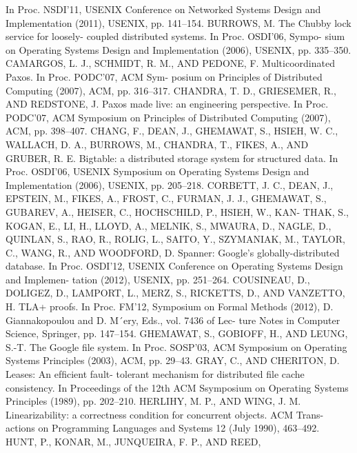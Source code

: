 \begin{thebibliography}{99}
    In Proc. NSDI’11, USENIX Conference on Networked
    Systems Design and Implementation (2011), USENIX,
    pp. 141–154.
     BURROWS, M. The Chubby lock service for loosely-
    coupled distributed systems. In Proc. OSDI’06, Sympo-
    sium on Operating Systems Design and Implementation
    (2006), USENIX, pp. 335–350.
    CAMARGOS, L. J., SCHMIDT, R. M., AND PEDONE, F.
    Multicoordinated Paxos. In Proc. PODC’07, ACM Sym-
    posium on Principles of Distributed Computing (2007),
    ACM, pp. 316–317.
    CHANDRA, T. D., GRIESEMER, R., AND REDSTONE, J.
    Paxos made live: an engineering perspective. In Proc.
    PODC’07, ACM Symposium on Principles of Distributed
    Computing (2007), ACM, pp. 398–407.
    CHANG, F., DEAN, J., GHEMAWAT, S., HSIEH, W. C.,
    WALLACH, D. A., BURROWS, M., CHANDRA, T.,
    FIKES, A., AND GRUBER, R. E. Bigtable: a distributed
    storage system for structured data. In Proc. OSDI’06,
    USENIX Symposium on Operating Systems Design and
    Implementation (2006), USENIX, pp. 205–218.
    CORBETT, J. C., DEAN, J., EPSTEIN, M., FIKES, A.,
    FROST, C., FURMAN, J. J., GHEMAWAT, S., GUBAREV,
    A., HEISER, C., HOCHSCHILD, P., HSIEH, W., KAN-
    THAK, S., KOGAN, E., LI, H., LLOYD, A., MELNIK,
    S., MWAURA, D., NAGLE, D., QUINLAN, S., RAO, R.,
    ROLIG, L., SAITO, Y., SZYMANIAK, M., TAYLOR, C.,
    WANG, R., AND WOODFORD, D. Spanner: Google’s
    globally-distributed database. In Proc. OSDI’12, USENIX
    Conference on Operating Systems Design and Implemen-
    tation (2012), USENIX, pp. 251–264.
    COUSINEAU, D., DOLIGEZ, D., LAMPORT, L., MERZ,
    S., RICKETTS, D., AND VANZETTO, H. TLA+ proofs.
    In Proc. FM’12, Symposium on Formal Methods (2012),
    D. Giannakopoulou and D. M´ery, Eds., vol. 7436 of Lec-
    ture Notes in Computer Science, Springer, pp. 147–154.
    GHEMAWAT, S., GOBIOFF, H., AND LEUNG, S.-T. The
    Google ﬁle system. In Proc. SOSP’03, ACM Symposium
    on Operating Systems Principles (2003), ACM, pp. 29–43.
    GRAY, C., AND CHERITON, D. Leases: An efﬁcient fault-
    tolerant mechanism for distributed ﬁle cache consistency.
    In Proceedings of the 12th ACM Ssymposium on Operating
    Systems Principles (1989), pp. 202–210.
    HERLIHY, M. P., AND WING, J. M. Linearizability: a
    correctness condition for concurrent objects. ACM Trans-
    actions on Programming Languages and Systems 12 (July
    1990), 463–492.
    HUNT, P., KONAR, M., JUNQUEIRA, F. P., AND REED,

\end{thebibliography}
